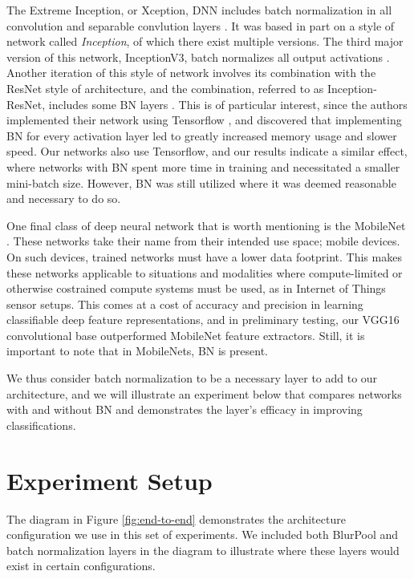 The Extreme Inception, or Xception, DNN includes batch normalization in all convolution and separable convlution layers \cite{chollet2017xception}.
It was based in part on a style of network called \textit{Inception}, of which there exist multiple versions.
The third major version of this network, InceptionV3, batch normalizes all output activations \cite{szegedy2016rethinking}.
Another iteration of this style of network involves its combination with the ResNet style of architecture, and the combination, referred to as Inception-ResNet, includes some BN layers \cite{szegedy2017inception}.
This is of particular interest, since the authors implemented their network using Tensorflow \cite{tensorflow2015-whitepaper}, and discovered that implementing BN for every activation layer led to greatly increased memory usage and slower speed.
Our networks also use Tensorflow, and our results indicate a similar effect, where networks with BN spent more time in training and necessitated a smaller mini-batch size.
However, BN was still utilized where it was deemed reasonable and necessary to do so.

One final class of deep neural network that is worth mentioning is the MobileNet \cite{howard2017mobilenets}.
These networks take their name from their intended use space; mobile devices.
On such devices, trained networks must have a lower data footprint.
This makes these networks applicable to situations and modalities where compute-limited or otherwise costrained compute systems must be used, as in Internet of Things sensor setups.
This comes at a cost of accuracy and precision in learning classifiable deep feature representations, and in preliminary testing, our VGG16 convolutional base outperformed MobileNet feature extractors.
Still, it is important to note that in MobileNets, BN is present.

We thus consider batch normalization to be a necessary layer to add to our architecture, and we will illustrate an experiment below that compares networks with and without BN and demonstrates the layer's efficacy in improving classifications.

\section{Experiment Setup}
\label{sec:bestmodel_experiment}

The diagram in Figure \ref{fig:end-to-end} demonstrates the architecture configuration we use in this set of experiments.
We included both BlurPool and batch normalization layers in the diagram to illustrate where these layers would exist in certain configurations.

